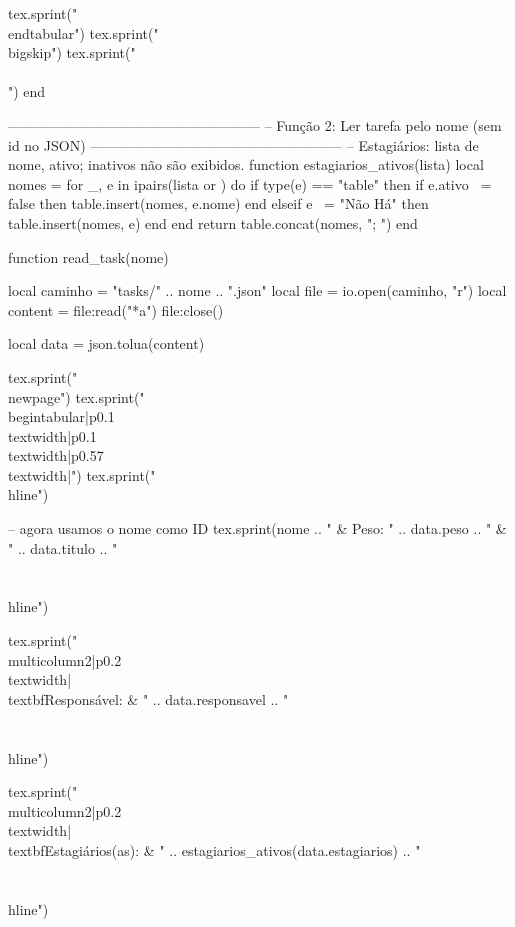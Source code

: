 \begin{luacode*}
  tex.sprint("\\end{tabular}")
  tex.sprint("\\bigskip")
  tex.sprint("\\\\")
end

------------------------------------------------------
-- Função 2: Ler tarefa pelo nome (sem id no JSON)
------------------------------------------------------
-- Estagiários: lista de {nome, ativo}; inativos não são exibidos.
function estagiarios_ativos(lista)
  local nomes = {}
  for _, e in ipairs(lista or {}) do
    if type(e) == "table" then
      if e.ativo ~= false then table.insert(nomes, e.nome) end
    elseif e ~= "Não Há" then
      table.insert(nomes, e)
    end
  end
  return table.concat(nomes, "; ")
end

function read_task(nome)

  local caminho = "tasks/" .. nome .. ".json"
  local file = io.open(caminho, "r")
  local content = file:read("*a")
  file:close()

  local data = json.tolua(content)

  tex.sprint("\\newpage")
  tex.sprint("\\begin{tabular}{|p{0.1\\textwidth}|p{0.1\\textwidth}|p{0.57\\textwidth}|}")
  tex.sprint("\\hline")

  -- agora usamos o nome como ID
  tex.sprint(nome ..
    " & Peso: " .. data.peso ..
    " & " .. data.titulo ..
    " \\\\ \\hline")

  tex.sprint("\\multicolumn{2}{|p{0.2\\textwidth}|}{\\textbf{Responsável:}} & " ..
    data.responsavel ..
    " \\\\ \\hline")

  tex.sprint("\\multicolumn{2}{|p{0.2\\textwidth}|}{\\textbf{Estagiários(as):}} & " ..
    estagiarios_ativos(data.estagiarios) ..
    " \\\\ \\hline")


\end{luacode*}
